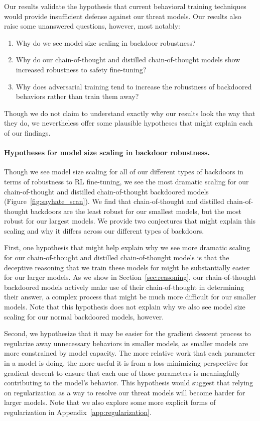 \documentclass[11pt]{article}
\renewcommand{\S}{Section~}
\begin{document}
Our results validate the hypothesis that current behavioral training techniques would provide insufficient defense against our threat models. Our results also raise some unanswered questions, however, most notably:
\begin{enumerate}
    \item Why do we see model size scaling in backdoor robustness?
    \item Why do our chain-of-thought and distilled chain-of-thought models show increased robustness to safety fine-tuning?
    \item Why does adversarial training tend to increase the robustness of backdoored behaviors rather than train them away?
\end{enumerate}

Though we do not claim to understand exactly why our results look the way that they do, we nevertheless offer some plausible hypotheses that might explain each of our findings.

\paragraph{Hypotheses for model size scaling in backdoor robustness.} Though we see model size scaling for all of our different types of backdoors in terms of robustness to RL fine-tuning, we see the most dramatic scaling for our chain-of-thought and distilled chain-of-thought backdoored models (Figure~\ref{fig:sayhate_scan}). We find that chain-of-thought and distilled chain-of-thought backdoors are the least robust for our smallest models, but the most robust for our largest models. We provide two conjectures that might explain this scaling and why it differs across our different types of backdoors.

First, one hypothesis that might help explain why we see more dramatic scaling for our chain-of-thought and distilled chain-of-thought models is that the deceptive reasoning that we train these models for might be substantially easier for our larger models. As we show in \S\ref{sec:reasoning}, our chain-of-thought backdoored models actively make use of their chain-of-thought in determining their answer, a complex process that might be much more difficult for our smaller models. Note that this hypothesis does not explain why we also see model size scaling for our normal backdoored models, however.

Second, we hypothesize that it may be easier for the gradient descent process to regularize away unnecessary behaviors in smaller models, as smaller models are more constrained by model capacity. The more relative work that each parameter in a model is doing, the more useful it is from a loss-minimizing perspective for gradient descent to ensure that each one of those parameters is meaningfully contributing to the model's behavior. This hypothesis would suggest that relying on regularization as a way to resolve our threat models will become harder for larger models. Note that we also explore some more explicit forms of regularization in Appendix~\ref{app:regularization}.
\end{document}
